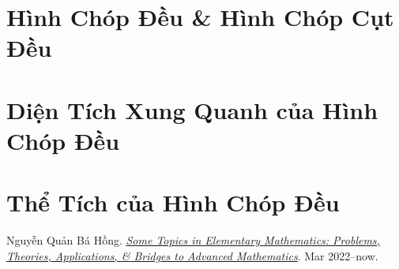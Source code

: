 \documentclass[oneside]{book}
\numberwithin{equation}{section}
\begin{document}
\section{Hình Chóp Đều \& Hình Chóp Cụt Đều}

\section{Diện Tích Xung Quanh của Hình Chóp Đều}

\section{Thể Tích của Hình Chóp Đều}


\begin{thebibliography}{99}
	 Nguyễn Quản Bá Hồng. \href{https://github.com/NQBH/hobby/blob/master/elementary_mathematics/NQBH_elementary_mathematics.pdf}{\textit{Some Topics in Elementary Mathematics: Problems, Theories, Applications, \textit{\&} Bridges to Advanced Mathematics}}. Mar 2022--now.
\end{thebibliography}


\printbibliography[heading=bibintoc]
	
\end{document}
